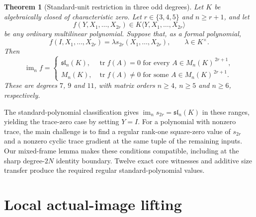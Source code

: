 \documentclass[11pt,reqno]{amsart}
\newcommand{\im}{\operatorname{im}}
\newcommand{\tr}{\operatorname{tr}}
\newcommand{\Mat}[1]{M_{#1}(K)}
\theoremstyle{plain}
\newtheorem{theorem}{Theorem}[section]
\theoremstyle{definition}
\numberwithin{equation}{section}
\begin{document}
\begin{theorem}[Standard-unit restriction in three odd degrees]\label{thm:main}
Let $K$ be algebraically closed of characteristic zero.  Let $r\in\{3,4,5\}$ and $n\ge r+1$, and let
\[
 f(Y,X_1,\ldots,X_{2r})\in K\langle Y,X_1,\ldots,X_{2r}\rangle
\]
be any ordinary multilinear polynomial.  Suppose that, as a formal polynomial,
\begin{equation}\label{eq:unit}
 f(I,X_1,\ldots,X_{2r})=\lambda s_{2r}(X_1,\ldots,X_{2r}),\qquad \lambda\in K^\times.
\end{equation}
Then
\begin{equation}\label{eq:main}
 \im_n f=\begin{cases}
  \mathfrak{sl}_n(K),&\tr f(A)=0\text{ for every }A\in\Mat n^{\,2r+1},\\
  M_n(K),&\tr f(A)\ne0\text{ for some }A\in\Mat n^{\,2r+1}.
 \end{cases}
\end{equation}
These are degrees $7$, $9$ and $11$, with matrix orders $n\ge4$, $n\ge5$ and $n\ge6$, respectively.
\end{theorem}

The standard-polynomial classification \cite[Theorem~1.1]{Miah2026Standard}
gives $\im_n s_{2r}=\mathfrak{sl}_n(K)$ in these ranges, yielding
the trace-zero case by setting $Y=I$.  For a polynomial with nonzero
trace, the main challenge is to find a regular rank-one square-zero
value of $s_{2r}$ and a nonzero cyclic trace gradient at the same
tuple of the remaining inputs.  Our mixed-frame lemma makes these
conditions compatible, including at the sharp degree-$2N$ identity
boundary.  Twelve exact core witnesses and additive size transfer
produce the required regular standard-polynomial values.

\section{Local actual-image lifting}\label{sec:local}
\end{document}
